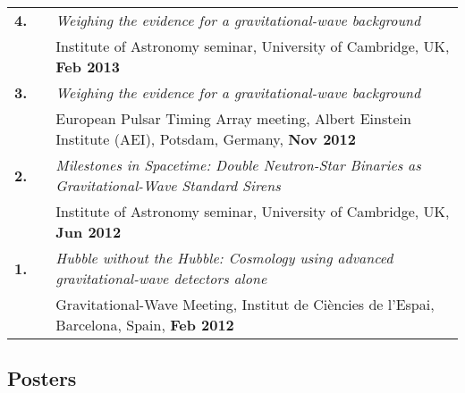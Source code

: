 \documentclass[11pt,letterpaper,sans]{moderncv}
\begin{document}
{\begin{longtable}{rp{0.3cm}p{15.8cm}}
\textbf{4.} & & \textit{Weighing the evidence for a gravitational-wave background} \\ 
&& Institute of Astronomy seminar, University of Cambridge, UK, \textbf{Feb 2013} \vspace{0.09cm}\\
\textbf{3.} & & \textit{Weighing the evidence for a gravitational-wave background} \\ 
&& European Pulsar Timing Array meeting, Albert Einstein Institute (AEI), Potsdam, Germany, \textbf{Nov 2012} \vspace{0.09cm}\\
\textbf{2.} & & \textit{Milestones in Spacetime: Double Neutron-Star Binaries as Gravitational-Wave Standard Sirens} \\ 
&& Institute of Astronomy seminar, University of Cambridge, UK, \textbf{Jun 2012} \vspace{0.09cm}\\
\textbf{1.} & & \textit{Hubble without the Hubble: Cosmology using advanced gravitational-wave detectors alone} \\ 
&& Gravitational-Wave Meeting, Institut de Ci\`encies de l'Espai, Barcelona, Spain, \textbf{Feb 2012} 
\end{longtable}
}

\subsection{Posters} \vspace{-0.3cm}

\end{document}
